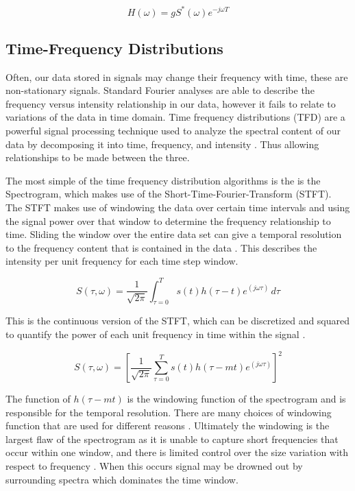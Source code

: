             \begin{equation}
                H(\omega) = gS^*(\omega)e^{-j\omega T}
            \end{equation}

            
        \subsection{Time-Frequency Distributions} \label{ss:TFD}
            Often, our data stored in signals may change their frequency with time, these are non-stationary signals. Standard Fourier analyses are able to describe the frequency versus intensity relationship in our data, however it fails to relate to variations of the data in time domain. Time frequency distributions (TFD) are a powerful signal processing technique used to analyze the spectral content of our data by decomposing it into time, frequency, and intensity \cite{gabor_theory_1946} \cite{hamilton_time_1994}. Thus allowing relationships to be made between the three. 

            The most simple of the time frequency distribution algorithms is the is the Spectrogram, which makes use of the Short-Time-Fourier-Transform (STFT). The STFT makes use of windowing the data over certain time intervals and using the signal power over that window to determine the frequency relationship to time. Sliding the window over the entire data set can give a temporal resolution to the frequency content that is contained in the data \cite{cohen_time-frequency_1989}. This describes the intensity per unit frequency for each time step window. 

            \begin{equation}
                S(\tau, \omega) = \frac{1}{\sqrt{2\pi}} \int_{\tau = 0}^T s(t) h(\tau - t) e^{(j\omega\tau)} \,d\tau
            \end{equation}

            This is the continuous version of the STFT, which can be discretized and squared to quantify the power of each unit frequency in time within the signal \cite{cohen_time-frequency_1989} \cite{sejdic_timefrequency_2009}. 

            \begin{equation}
                S(\tau, \omega) = [\frac{1}{\sqrt{2\pi}} \sum_{\tau = 0}^T s(t) h(\tau - mt) e^{(j\omega\tau)}]^2
            \end{equation}

            The function of $h(\tau -mt)$ is the windowing function of the spectrogram and is responsible for the temporal resolution. There are many choices of windowing function that are used for different reasons \cite{varanis_comparison_2020} \cite{harris_use_1978}. Ultimately the windowing is the largest flaw of the spectrogram as it is unable to capture short frequencies that occur within one window, and there is limited control over the size variation with respect to frequency \cite{sejdic_timefrequency_2009}. When this occurs signal may be drowned out by surrounding spectra which dominates the time window.

